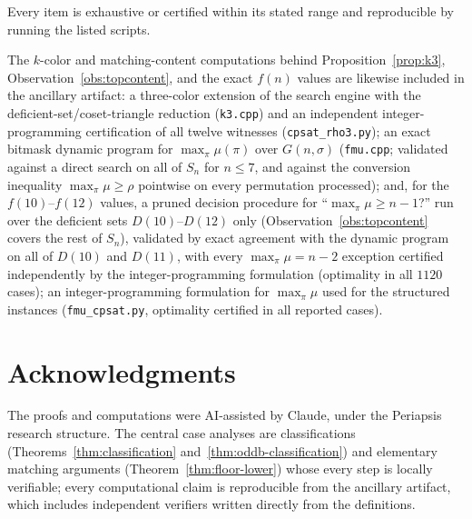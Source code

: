 \documentclass[11pt]{article}
\theoremstyle{definition}
\begin{document}
Every item is exhaustive or certified within its stated range and reproducible by
running the listed scripts.

The $k$-color and matching-content computations behind
Proposition~\ref{prop:k3}, Observation~\ref{obs:topcontent}, and the exact
$f(n)$ values are likewise included in the ancillary artifact: a three-color
extension of the search engine with the deficient-set/coset-triangle reduction
(\texttt{k3.cpp}) and an independent integer-programming certification of all
twelve witnesses (\texttt{cpsat\_rho3.py}); an exact bitmask dynamic program
for $\max_\pi \mu(\pi)$ over $G(n,\sigma)$ (\texttt{fmu.cpp}; validated
against a direct search on all of $S_n$ for $n \le 7$, and against the
conversion inequality $\max_\pi \mu \ge \rho$ pointwise on every permutation
processed); and, for the $f(10)$--$f(12)$ values, a pruned decision procedure
for ``$\max_\pi \mu \ge n-1$?'' run over the deficient sets $D(10)$--$D(12)$
only (Observation~\ref{obs:topcontent} covers the rest of $S_n$), validated by
exact agreement with the dynamic program on all of $D(10)$ and $D(11)$, with
every $\max_\pi \mu = n-2$ exception certified independently by the
integer-programming formulation (optimality in all $1120$ cases); an
integer-programming formulation for $\max_\pi \mu$ used for
the structured instances (\texttt{fmu\_cpsat.py}, optimality certified in all
reported cases).

\section*{Acknowledgments}

The proofs and computations were
AI-assisted by Claude, under the Periapsis research structure.
The central case analyses are classifications
(Theorems~\ref{thm:classification} and~\ref{thm:oddb-classification}) and elementary
matching arguments (Theorem~\ref{thm:floor-lower}) whose every step is locally
verifiable; every computational claim is reproducible from the ancillary artifact,
which includes independent verifiers written directly from the definitions.
\end{document}
